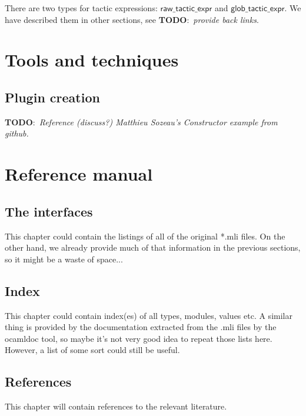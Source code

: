 \documentclass[a4paper,oneside]{book}
\newcommand{\m}[1]{\ensuremath{\mathsf{#1}}}
\newcommand{\TODO}[1]{\textbf{TODO}:\ \emph{#1}}
\begin{document}
There are two types for tactic expressions: \m{raw\_tactic\_expr} and
\m{glob\_tactic\_expr}. We have described them in other sections, see
\TODO{provide back links}.

\part{Tools and techniques}

\chapter{Plugin creation}

\TODO{Reference (discuss?) Matthieu Sozeau's Constructor example from
  github.}

\part{Reference manual}

\chapter{The interfaces}

This chapter could contain the listings of all of the original *.mli
files. On the other hand, we already provide much of that information
in the previous sections, so it might be a waste of space...

\chapter{Index}

This chapter could contain index(es) of all types, modules, values
etc. A similar thing is provided by the documentation extracted from
the .mli files by the ocamldoc tool, so maybe it's not very good idea
to repeat those lists here. However, a list of some sort could still
be useful.

\chapter{References}

This chapter will contain references to the relevant literature.
\end{document}
